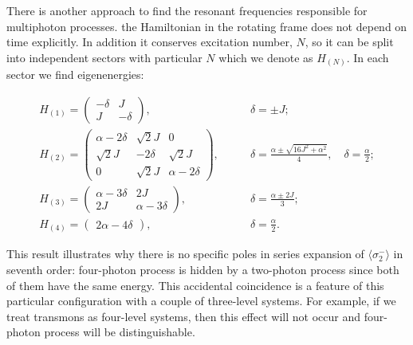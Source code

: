 \documentclass[%
 aps, pra,
 amsmath,amssymb,
 preprint,%
superscriptaddress
]{revtex4-2}
\begin{document}
There is another approach to find the resonant frequencies responsible for multiphoton processes. 
the Hamiltonian in the rotating frame does not depend on time explicitly. In addition it conserves excitation number, $N$, so it can be split into independent sectors with particular $N$ which we denote as $H_{(N)}$.
In each sector we find eigenenergies:
\begin{widetext}
$$
\begin{array}{ccc}
H_{(1)} = \begin{pmatrix}
-\delta & J
\\
J & -\delta
\end{pmatrix},
\qquad &
\delta = \pm J;
\\[1em]
H_{(2)} = \begin{pmatrix}
\alpha - 2\delta & \sqrt{2} J & 0
\\
\sqrt{2} J & - 2\delta & \sqrt{2} J
\\
0 & \sqrt{2} J & \alpha - 2 \delta
\end{pmatrix},
\qquad &
\displaystyle
\delta = \frac{\alpha \pm \sqrt{16 J^2 + \alpha^2}}{4}, \quad \delta = \frac{\alpha}{2};
\\[2em]
H_{(3)} = \begin{pmatrix}
\alpha - 3\delta & 2J
\\
2 J & \alpha - 3 \delta
\end{pmatrix},
\qquad & \displaystyle
\delta = \frac{\alpha \pm 2 J}{3};
\\[2em]
H_{(4)} = \begin{pmatrix}
2 \alpha - 4\delta
\end{pmatrix},
\qquad & \displaystyle
\delta = \frac{\alpha}{2}.
\end{array}
$$
\end{widetext}
This result illustrates why there is no specific poles in series expansion of $\langle\sigma_{2}^-\rangle$ in seventh order: four-photon process is hidden by a two-photon process since both of them have the same energy. This accidental coincidence is a feature of this particular configuration with a couple of three-level systems. For example, if we treat transmons as  four-level systems, then this effect will not occur and four-photon process will be distinguishable.
\end{document}
